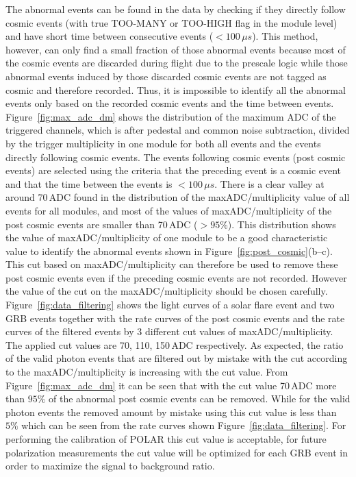 \documentclass[preprint,sort&compress,12pt]{elsarticle}
\begin{document}
The abnormal events can be found in the data by checking if they directly follow cosmic events (with true TOO-MANY or TOO-HIGH flag in the module level) and have short time between consecutive events ($<100\,\mu s$). This method, however, can only find a small fraction of those abnormal events because most of the cosmic events are discarded during flight due to the prescale logic while those abnormal events induced by those discarded cosmic events are not tagged as cosmic and therefore recorded. Thus, it is impossible to identify all the abnormal events only based on the recorded cosmic events and the time between events. Figure~\ref{fig:max_adc_dm} shows the distribution of the maximum ADC of the triggered channels, which is after pedestal and common noise subtraction, divided by the trigger multiplicity in one module for both all events and the events directly following cosmic events. The events following cosmic events (post cosmic events) are selected using the criteria that the preceding event is a cosmic event and that the time between the events is $<100\,\mu s$. There is a clear valley at around 70\,ADC found in the distribution of the maxADC/multiplicity value of all events for all modules, and most of the values of maxADC/multiplicity of the post cosmic events are smaller than 70\,ADC ($>95\%$). This distribution shows the value of maxADC/multiplicity of one module to be a good characteristic value to identify the abnormal events shown in Figure~\ref{fig:post_cosmic}(b--c). This cut based on maxADC/multiplicity can therefore be used to remove these post cosmic events even if the preceding cosmic events are not recorded. However the value of the cut on the maxADC/multiplicity should be chosen carefully. Figure~\ref{fig:data_filtering} shows the light curves of a solar flare event and two GRB events together with the rate curves of the post cosmic events and the rate curves of the filtered events by 3 different cut values of maxADC/multiplicity. The applied cut values are 70, 110, 150\,ADC respectively. As expected, the ratio of the valid photon events that are filtered out by mistake with the cut according to the maxADC/multiplicity is increasing with the cut value. From Figure~\ref{fig:max_adc_dm} it can be seen that with the cut value 70\,ADC more than $95\%$ of the abnormal post cosmic events can be removed. While for the valid photon events the removed amount by mistake using this cut value is less than $5\%$ which can be seen from the rate curves shown Figure~\ref{fig:data_filtering}. For performing the calibration of POLAR this cut value is acceptable, for future polarization measurements the cut value will be optimized for each GRB event in order to maximize the signal to background ratio.
\end{document}
